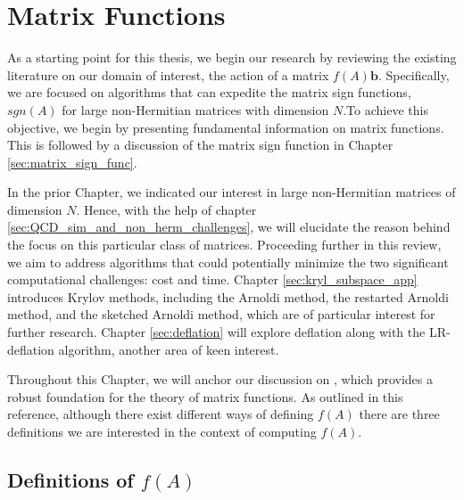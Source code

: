 \chapter{Matrix Functions}
\label{sec:matrix_fun}

As a starting point for this thesis, we begin our research by reviewing the existing literature on our domain of interest, the action of a matrix $f(A)\mathbf{b}$. Specifically, we are focused on algorithms that can expedite the matrix sign functions, $sgn(A)$ for large non-Hermitian matrices with dimension $N$.To achieve this objective, we begin by presenting fundamental information on matrix functions. This is followed by a discussion of the matrix sign function in Chapter \ref{sec:matrix_sign_func}. 

In the prior Chapter, we indicated our interest in large non-Hermitian matrices of dimension $N$. Hence, with the help of chapter \ref{sec:QCD_sim_and_non_herm_challenges}, we will elucidate the reason behind the focus on this particular class of matrices. Proceeding further in this review, we aim to address algorithms that could potentially minimize the two significant computational challenges: cost and time. Chapter \ref{sec:kryl_subspace_app} introduces Krylov methods, including the Arnoldi method, the restarted Arnoldi method, and the sketched Arnoldi method, which are of particular interest for further research. Chapter \ref{sec:deflation} will explore deflation along with the LR-deflation algorithm, another area of keen interest.

Throughout this Chapter, we will anchor our discussion on \cite{8}, which provides a robust foundation for the theory of matrix functions. As outlined in this reference, although there exist different ways of defining $f(A)$ there are three definitions we are interested in the context of computing $f(A)$.

\section{Definitions of \emph{$f(A)$}}
\label{sec:def_f(A)}


